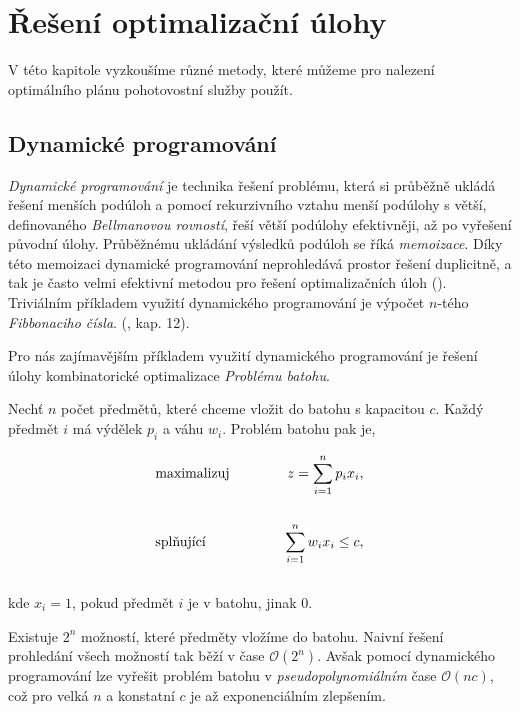 \chapter{Řešení optimalizační úlohy}\label{chap:reseniOptUloh}

V této kapitole vyzkoušíme různé metody, které můžeme pro nalezení optimálního plánu pohotovostní služby použít.

\section{Dynamické programování}\label{kap:dynamicProgram}

\textit{Dynamické programování} je technika řešení problému, která si průběžně ukládá řešení menších podúloh a pomocí rekurzivního vztahu menší podúlohy s větší,
definovaného \textit{Bellmanovou rovností}, řeší větší podúlohy efektivněji, až po vyřešení původní úlohy. 
Průběžnému ukládání výsledků podúloh se říká \textit{memoizace}.
Díky této memoizaci dynamické programování neprohledává prostor řešení duplicitně, a tak je často velmi efektivní metodou pro řešení optimalizačních úloh (\citet{dynamic}).
Triviálním příkladem využití dynamického programování je výpočet $n$-tého \textit{Fibbonaciho čísla}. (\citet{mares}, kap. 12).

Pro nás zajímavějším příkladem využití dynamického programování je řešení úlohy kombinatorické optimalizace \textit{Problému batohu}.

\begin{definice}
  Nechť $n$ počet předmětů, které chceme vložit do batohu s kapacitou $c$.
  Každý předmět $i$ má výdělek $p_i$ a váhu $w_i$. Problém batohu pak je,

  \begin{alignat*}{2}
    &\normalfont \text{maximalizuj} \hspace{30pt} &z = \sum_{i=1}^n p_i x_i, \\
    \\
    &\normalfont \text{splňující}   \hspace{30pt} &\sum_{i = 1}^{n} w_i x_i \leq c,
  \end{alignat*}
  \\
  kde $x_i = 1$, pokud předmět $i$ je v batohu, jinak $0$.
  \\
\end{definice}

Existuje $2^n$ možností, které předměty vložíme do batohu. Naivní řešení prohledání všech možností tak běží v čase $\mathcal{O} (2^n)$.
Avšak pomocí dynamického programování lze vyřešit problém batohu v \textit{pseudopolynomiálním} čase $\mathcal{O}(nc)$,
což pro velká $n$ a konstatní $c$ je až exponenciálním zlepšením.

